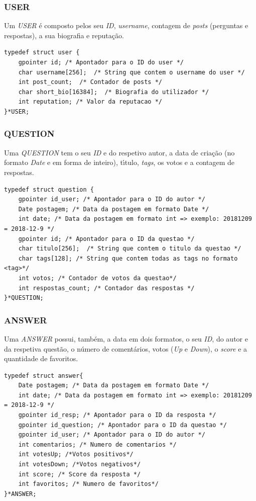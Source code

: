 \documentclass{article}
\begin{document}
\subsubsection{USER}
Um \emph{USER} \'{e} composto pelos seu \emph{ID}, \emph{username}, contagem de \emph{posts} (perguntas e respostas), a sua biografia e reputa\c{c}\~{a}o.

\begin{lstlisting}
typedef struct user {
    gpointer id; /* Apontador para o ID do user */
    char username[256];  /* String que contem o username do user */
    int post_count;  /* Contador de posts */
    char short_bio[16384];  /* Biografia do utilizador */
    int reputation; /* Valor da reputacao */ 
}*USER;
\end{lstlisting}

\subsubsection{QUESTION}
\par Uma \emph{QUESTION} tem o seu \emph{ID} e do respetivo autor, a data de cria\c{c}\~{a}o (no formato \emph{Date} e em forma de inteiro), t\'{\i}tulo, \emph{tags}, os votos e a contagem de respostas.

\begin{lstlisting}
typedef struct question {
    gpointer id_user; /* Apontador para o ID do autor */
    Date postagem; /* Data da postagem em formato Date */
    int date; /* Data da postagem em formato int => exemplo: 20181209 = 2018-12-9 */
    gpointer id; /* Apontador para o ID da questao */
    char titulo[256];  /* String que contem o titulo da questao */
    char tags[128]; /* String que contem todas as tags no formato <tag>*/
    int votos; /* Contador de votos da questao*/
    int respostas_count; /* Contador das respostas */
}*QUESTION;

\end{lstlisting}

\subsubsection{ANSWER}
\par  Uma \emph{ANSWER} possui, tamb\'{e}m, a data em dois formatos, o seu \emph{ID}, do autor e da respetiva quest\~{a}o, o n\'{u}mero de coment\'{a}rios, votos (\emph{Up} e \emph{Down}), o \emph{score} e a quantidade de favoritos.

\begin{lstlisting}
typedef struct answer{
	Date postagem; /* Data da postagem em formato Date */
	int date; /* Data da postagem em formato int => exemplo: 20181209 = 2018-12-9 */
	gpointer id_resp; /* Apontador para o ID da resposta */
	gpointer id_question; /* Apontador para o ID da questao */
	gpointer id_user; /* Apontador para o ID do autor */
	int comentarios; /* Numero de comentarios */
	int votesUp; /*Votos positivos*/
	int votesDown; /*Votos negativos*/
	int score; /* Score da resposta */
	int favoritos; /* Numero de favoritos*/
}*ANSWER;
\end{lstlisting}
\end{document}
